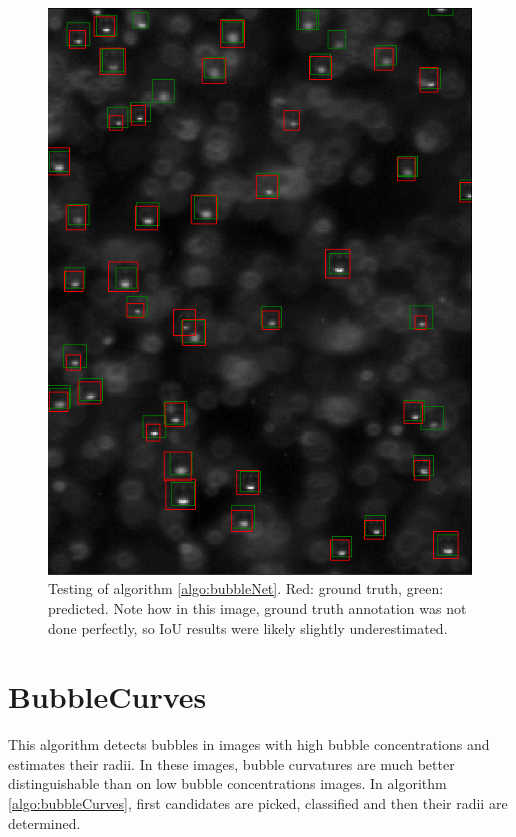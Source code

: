 			\begin{figure}
				\centering
				\includegraphics[scale=0.8]{images/bubbleNet_validation_result.png}
				\caption{Testing of algorithm \ref{algo:bubbleNet}. Red: ground truth, green: predicted. Note how in this image, ground truth annotation was not done perfectly, so IoU results were likely slightly underestimated.}
				\label{fig:bubbleNet_result}
			\end{figure}
	
	
	
	
	
	
	\section{BubbleCurves}\label{BubbleCurves}
		This algorithm detects bubbles in images with high bubble concentrations and estimates their radii. In these images, bubble curvatures are much better distinguishable than on low bubble concentrations images. In algorithm \ref{algo:bubbleCurves}, first candidates are picked, classified and then their radii are determined.
	
